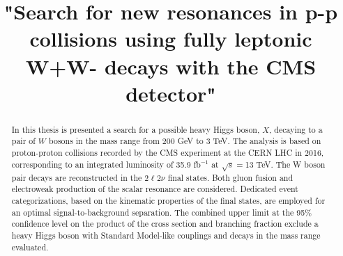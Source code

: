 \documentclass[PhD,binding=0.6cm]{../sapthesis}
\title{"Search for new resonances in p-p collisions using fully leptonic W+W- decays with the CMS detector" }
\begin{document}
\newcommand{\aMC}{\textsc{MadGraph}\xspace}
\newcommand{\qqbar}{$q \bar{q}$}
\newcommand{\POWHEG} {{\textsc{powheg}}\xspace}

\frontmatter

\maketitle

\dedication{  dedica a...}



\begin{abstract}
In this thesis is presented a search for a possible heavy Higgs boson, $X$, decaying to a pair of $W$
bosons in the mass range from 200 GeV to 3 TeV. The analysis is based on proton-proton 
collisions recorded by the CMS experiment at the CERN LHC in 2016, corresponding to an integrated luminosity of 
35.9 fb$^{-1}$  at $\sqrt{s}=$13 TeV. The W boson pair decays are reconstructed in the $2\ell 2\nu$  final states. 
Both gluon fusion and electroweak production of the scalar resonance are considered. 
Dedicated event categorizations, based on the kinematic properties of the final states, are employed for an
optimal signal-to-background separation. The combined upper limit at the 95\% confidence level on the product of the cross section and branching fraction 
exclude a heavy Higgs boson with Standard Model-like couplings and decays in the mass range
evaluated.
\end{abstract}


\tableofcontents

\end{document}
